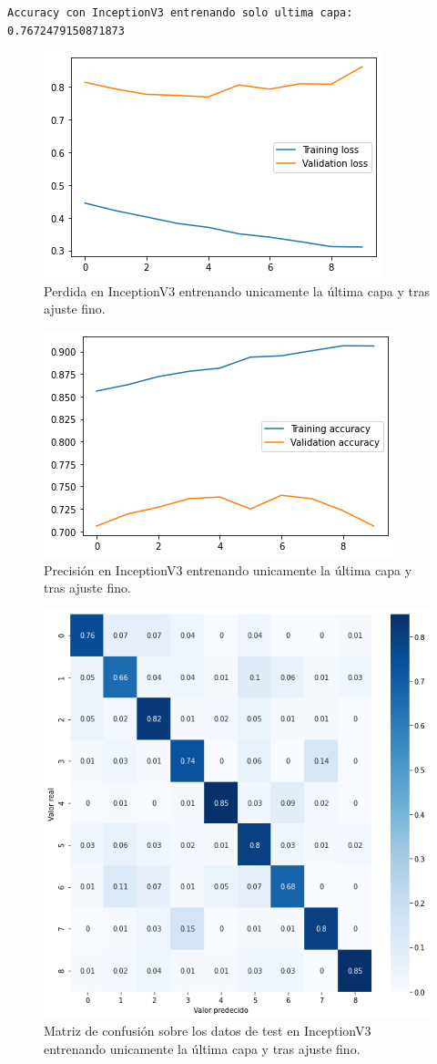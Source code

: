 \begin{lstlisting}
Accuracy con InceptionV3 entrenando solo ultima capa: 0.7672479150871873
\end{lstlisting}


\begin{figure}[H]
  \centering
  \includegraphics[width=0.5\linewidth]{Imagenes/entrenamiento_redes/ult/inception_fine_loss.png}
  \caption{Perdida en InceptionV3 entrenando unicamente la última capa y tras ajuste fino.}
\end{figure}

\begin{figure}[H]
  \centering
  \includegraphics[width=0.5\linewidth]{Imagenes/entrenamiento_redes/ult/inception_fine_acc.png}
  \caption{Precisión en InceptionV3 entrenando unicamente la última capa y tras ajuste fino.}
\end{figure}

\begin{figure}[H]
  \centering
  \includegraphics[width=0.5\linewidth]{Imagenes/entrenamiento_redes/ult/inception_fine_matriz.png}
  \caption{Matriz de confusión sobre los datos de test en InceptionV3 entrenando unicamente la última capa y tras ajuste fino.}
\end{figure}


